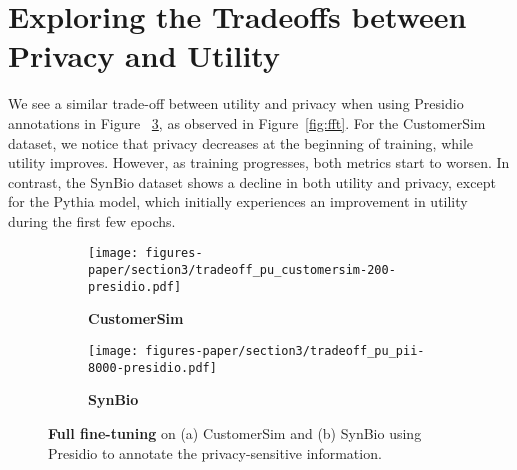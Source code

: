 \section{Exploring the Tradeoffs between Privacy and Utility}
\label{appendix:exploring-tradeoffs}

We see a similar trade-off between utility and privacy when using Presidio annotations in Figure ~\ref{fig:appendix-fft}, as observed in Figure~\ref{fig:fft}. For the CustomerSim dataset, we notice that privacy decreases at the beginning of training, while utility improves. However, as training progresses, both metrics start to worsen. In contrast, the SynBio dataset shows a decline in both utility and privacy, except for the Pythia model, which initially experiences an improvement in utility during the first few epochs.
\vspace{-10pt}
\begin{figure}[H]
    \centering
    \begin{subfigure}{0.49\linewidth}
    \centering
    \texttt{[image: figures-paper/section3/tradeoff\_pu\_customersim-200-presidio.pdf]}
    \caption{\textbf{CustomerSim}}
    \label{fig:appendix-ffta}
    \end{subfigure}
    \begin{subfigure}{0.49\linewidth}
    \centering
    \texttt{[image: figures-paper/section3/tradeoff\_pu\_pii-8000-presidio.pdf]}
    \caption{\textbf{SynBio}}
    \label{fig:appendifftb}    
    \end{subfigure}
    \caption{\textbf{Full fine-tuning} on (a) CustomerSim and  (b) SynBio using Presidio to annotate the privacy-sensitive information.}
    \label{fig:appendix-fft}
\end{figure}

